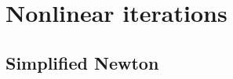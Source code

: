 \documentclass[review]{siamart}
\makeatletter
\newcommand{\todo}[1]{\textcolor{red}{[TODO\@: #1]}}
\makeatother
\begin{document}
\section{Nonlinear iterations}\label{sec:nonlinear}




\subsection{Simplified Newton}\label{sec:nonlinear:simp}
\end{document}
